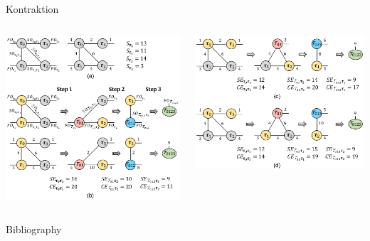 \documentclass{beamer}
\begin{document}
\begin{frame}{Kontraktion}
	\begin{columns}
		\begin{column}{0.5\textwidth}
			\includegraphics[scale=.17]{figure-3-a}
		\end{column}
		\begin{column}{0.5\textwidth}
			\includegraphics[scale=.17]{figure-3-b}
		\end{column}
	\end{columns}
\end{frame}


\begin{frame}[allowframebreaks]{Bibliography}
	
	
\end{frame}
\end{document}
